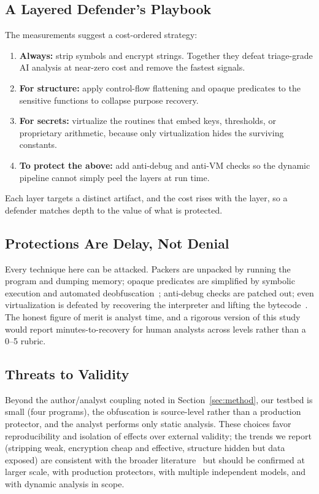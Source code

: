 \documentclass[conference]{IEEEtran}
\begin{document}
\subsection{A Layered Defender's Playbook}
The measurements suggest a cost-ordered strategy:
\begin{enumerate}
\item \textbf{Always:} strip symbols and encrypt strings. Together they defeat
triage-grade AI analysis at near-zero cost and remove the fastest signals.
\item \textbf{For structure:} apply control-flow flattening and opaque predicates
to the sensitive functions to collapse purpose recovery.
\item \textbf{For secrets:} virtualize the routines that embed keys, thresholds,
or proprietary arithmetic, because only virtualization hides the surviving
constants.
\item \textbf{To protect the above:} add anti-debug and anti-VM checks so the
dynamic pipeline cannot simply peel the layers at run time.
\end{enumerate}
Each layer targets a distinct artifact, and the cost rises with the layer, so a
defender matches depth to the value of what is protected.

\subsection{Protections Are Delay, Not Denial}
Every technique here can be attacked. Packers are unpacked by running the program
and dumping memory; opaque predicates are simplified by symbolic execution and
automated deobfuscation~\cite{angr,udupa}; anti-debug checks are patched out;
even virtualization is defeated by recovering the interpreter and lifting the
bytecode~\cite{rolles}. The honest figure of merit is analyst time, and a rigorous
version of this study would report minutes-to-recovery for human analysts across
levels rather than a 0--5 rubric.

\subsection{Threats to Validity}
Beyond the author/analyst coupling noted in Section~\ref{sec:method}, our testbed
is small (four programs), the obfuscation is source-level rather than a production
protector, and the analyst performs only static analysis. These choices favor
reproducibility and isolation of effects over external validity; the trends we
report (stripping weak, encryption cheap and effective, structure hidden but data
exposed) are consistent with the broader literature~\cite{protecting-survey,
obf-taxonomy} but should be confirmed at larger scale, with production protectors,
with multiple independent models, and with dynamic analysis in scope.
\end{document}
